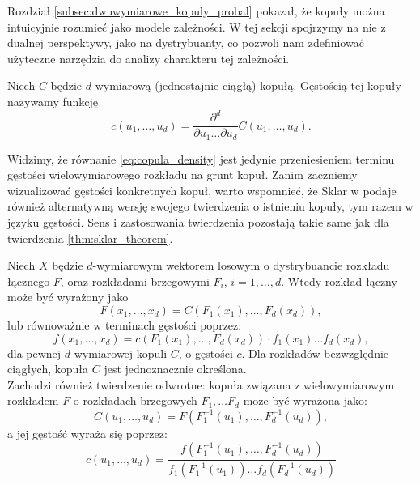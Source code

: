 Rozdział \ref{subsec:dwuwymiarowe_kopuly_probal} pokazał, że kopuły można intuicyjnie rozumieć jako modele zależności. W tej sekcji spojrzymy na nie z dualnej perspektywy, jako na dystrybuanty, co pozwoli nam zdefiniować użyteczne narzędzia do analizy charakteru tej zależności.

\begin{df}
	Niech $C$ będzie $d$-wymiarową (jednostajnie ciągłą) kopułą. Gęstością tej kopuły nazywamy funkcję
	\begin{equation}
		c(u_1, \dots, u_d) = \frac{\partial^d}{\partial u_1\dots \partial u_d}C(u_1, \dots, u_d).
		\label{eq:copula_density}
	\end{equation}
\end{df}


Widzimy, że równanie \ref{eq:copula_density} jest jedynie przeniesieniem terminu gęstości wielowymiarowego rozkładu na grunt kopuł. Zanim zaczniemy wizualizować gęstości konkretnych kopuł, warto wspomnieć, że Sklar w \cite{Sklar_Theorem} podaje również alternatywną wersję swojego twierdzenia o istnieniu kopuły, tym razem w języku gęstości. Sens i zastosowania twierdzenia pozostają takie same jak dla twierdzenia \ref{thm:sklar_theorem}.
\begin{thm}
	Niech $X$ będzie $d$-wymiarowym wektorem losowym o dystrybuancie rozkładu łącznego $F$, oraz rozkładami brzegowymi $F_i$, $i=1, \dots, d$. Wtedy rozkład łączny może być wyrażony jako		$$F(x_1, \dots, x_d) = C(F_1(x_1), \dots, F_d(x_d)),$$
	lub równoważnie w terminach gęstości poprzez:
	$$ f(x_1, \dots, x_d) = c(F_1(x_1), \dots, F_d(x_d))\cdot f_1(x_1)\dots f_d(x_d),$$
	dla pewnej $d$-wymiarowej kopuli $C$, o gęstości $c$. Dla rozkładów bezwzględnie ciągłych, kopuła $C$ jest jednoznacznie określona.\\
	Zachodzi również twierdzenie odwrotne: kopuła związana z wielowymiarowym rozkładem $F$ o rozkładach brzegowych $F_1, \dots F_d$ może być wyrażona jako:
	$$C(u_1, \dots, u_d) = F(F_1^{-1}(u_1), \dots, F_d^{-1}(u_d)),$$
	a jej gęstość wyraża się poprzez:
	$$c(u_1, \dots, u_d) = \frac{f(F_1^{-1}(u_1), \dots, F_d^{-1}(u_d))}{f_1(F_1^{-1}(u_1))\dots f_d(F_d^{-1}(u_d))}$$
	\label{thm:sklar_theorem_density}
\end{thm}

